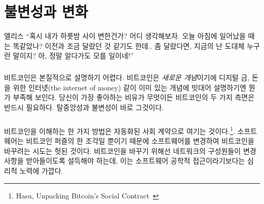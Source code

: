 \chapter{불변성과 변화}
\label{les:1}

\begin{chapquote}{앨리스}
	\enquote{혹시 내가 하룻밤 사이 변한건가? 어디 생각해보자.
		오늘 아침에 일어났을 때는 똑같았나? 이전과 조금 달랐던 것 같기도 한데.. 
		좀 달랐다면, 지금의 난 도대체 누구란 말이지? 아, 정말 알다가도 모를 일이네!}
\end{chapquote}

\paragraph{}
비트코인은 본질적으로 설명하기 어렵다. 
비트코인은 \textit{새로운 개념}이기에 디지털 금, 돈을 위한 인터넷(the internet of money) 같이 이미 있는 개념에 빗대어 설명하기엔 뭔가 부족해 보인다. 
당신이 가장 좋아하는 비유가 무엇이든 비트코인의 두 가지 측면은 반드시 필요하다. 탈중앙성과 불변성이 바로 그것이다.

\paragraph{}
비트코인을 이해하는 한 가지 방법은 자동화된 사회 계약으로 여기는 것이다.\footnote{Hasu, Unpacking Bitcoin's Social Contract~\cite{social-contract}}. 
소프트웨어는 비트코인 퍼즐의 한 조각일 뿐이기 때문에 소프트웨어를 변경하여 비트코인을 바꾸려는 시도는 헛된 것이다.
비트코인을 바꾸기 위해선 네트워크의 구성원들이 변경 사항을 받아들이도록 설득해야 하는데, 이는 소프트웨어 공학적 접근이라기보다는 심리적 노력에 가깝다.

